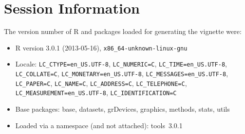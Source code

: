 \documentclass[11pt,a4paper]{article}
\begin{document}
\clearpage

\section*{Session Information}

The version number of R and packages loaded for generating the vignette were:


\begin{itemize}\raggedright
  \item R version 3.0.1 (2013-05-16), \verb|x86_64-unknown-linux-gnu|
  \item Locale: \verb|LC_CTYPE=en_US.UTF-8|, \verb|LC_NUMERIC=C|, \verb|LC_TIME=en_US.UTF-8|, \verb|LC_COLLATE=C|, \verb|LC_MONETARY=en_US.UTF-8|, \verb|LC_MESSAGES=en_US.UTF-8|, \verb|LC_PAPER=C|, \verb|LC_NAME=C|, \verb|LC_ADDRESS=C|, \verb|LC_TELEPHONE=C|, \verb|LC_MEASUREMENT=en_US.UTF-8|, \verb|LC_IDENTIFICATION=C|
  \item Base packages: base, datasets, grDevices, graphics, methods,
    stats, utils
  \item Loaded via a namespace (and not attached): tools~3.0.1
\end{itemize}
\end{document}
